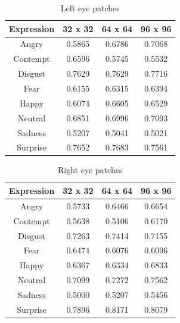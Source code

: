 
\begin{table}
\caption{Left eye patches}
\label{table:left_eye}

\begin{tabular}{| c | c | c | c |}
\hline
Expression & 32 x 32 &  64 x 64  & 96 x 96  \\

\hline
Angry & 0.5865 & 0.6786 & 0.7068 \\
Contempt & 0.6596 &	0.5745 & 0.5532 \\
Disgust	& 0.7629 &	0.7629 &	0.7716 \\
Fear &	0.6155 & 0.6315 & 0.6394 \\ 
Happy &	0.6074 & 0.6605 & 0.6529 \\ 
Neutral & 0.6851 &	0.6996 & 0.7093 \\
Sadness & 0.5207 & 0.5041 &	0.5021 \\
Surprise & 0.7652 &	0.7683 & 0.7561 \\

\hline
\end{tabular}
\end{table}

\begin{table}
\caption{Right eye patches}
\label{table:right_eye}

\begin{tabular}{| c | c | c | c |}
\hline
Expression & 32 x 32 &  64 x 64  & 96 x 96  \\

\hline
Angry    & 0.5733 & 0.6466 & 0.6654 \\
Contempt & 0.5638 & 0.5106 & 0.6170 \\ 
Disgust	 & 0.7263 & 0.7414 & 0.7155 \\
Fear	 & 0.6474 & 0.6076 & 0.6096 \\
Happy	 & 0.6367 & 0.6334 & 0.6833 \\
Neutral  & 0.7099 & 0.7272 & 0.7562 \\
Sadness  & 0.5000 & 0.5207 & 0.5456 \\
Surprise & 0.7896 & 0.8171 & 0.8079 \\

\hline
\end{tabular}
\end{table}

